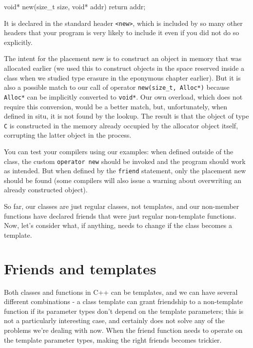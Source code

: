 \begin{code}
void* new(size_t size, void* addr) { return addr; }
\end{code}

It is declared in the standard header \texttt{\textless{}new\textgreater{}}, which is included by so many other headers that your program is very likely to include it even if you did not do so explicitly.

The intent for the placement new is to construct an object in memory that was allocated earlier (we used this to construct objects in the space reserved inside a class when we studied type erasure in the eponymous chapter earlier). But it is also a possible match to our call of operator \texttt{new(size\_t,\ Alloc*)} because \texttt{Alloc*} can be implicitly converted to \texttt{void*}. Our own overload, which does not require this conversion, would be a better match, but, unfortunately, when defined in situ, it is not found by the lookup. The result is that the object of type \texttt{C} is constructed in the memory already occupied by the allocator object itself, corrupting the latter object in the process.

You can test your compilers using our examples: when defined outside of the class, the custom \texttt{operator\ new} should be invoked and the program should work as intended. But when defined by the \texttt{friend} statement, only the placement new should be found (some compilers will also issue a warning about overwriting an already constructed object).

So far, our classes are just regular classes, not templates, and our non-member functions have declared friends that were just regular non-template functions. Now, let's consider what, if anything, needs to change if the class becomes a template.

\section{Friends and templates}

Both classes and functions in C++ can be templates, and we can have several different combinations - a class template can grant friendship to a non-template function if its parameter types don't depend on the template parameters; this is not a particularly interesting case, and certainly does not solve any of the problems we're dealing with now. When the friend function needs to operate on the template parameter types, making the right friends becomes trickier.

